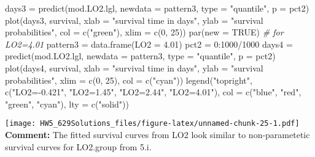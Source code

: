 \documentclass[
]{article}
\newenvironment{Shaded}{\begin{snugshade}}{\end{snugshade}}
\newcommand{\AttributeTok}[1]{\textcolor[rgb]{0.77,0.63,0.00}{#1}}
\newcommand{\CommentTok}[1]{\textcolor[rgb]{0.56,0.35,0.01}{\textit{#1}}}
\newcommand{\ConstantTok}[1]{\textcolor[rgb]{0.00,0.00,0.00}{#1}}
\newcommand{\DecValTok}[1]{\textcolor[rgb]{0.00,0.00,0.81}{#1}}
\newcommand{\FloatTok}[1]{\textcolor[rgb]{0.00,0.00,0.81}{#1}}
\newcommand{\FunctionTok}[1]{\textcolor[rgb]{0.00,0.00,0.00}{#1}}
\newcommand{\NormalTok}[1]{#1}
\newcommand{\OtherTok}[1]{\textcolor[rgb]{0.56,0.35,0.01}{#1}}
\newcommand{\SpecialCharTok}[1]{\textcolor[rgb]{0.00,0.00,0.00}{#1}}
\newcommand{\StringTok}[1]{\textcolor[rgb]{0.31,0.60,0.02}{#1}}
\begin{document}
\begin{Shaded}
\begin{Highlighting}[]
\NormalTok{days3 }\OtherTok{=} \FunctionTok{predict}\NormalTok{(mod.LO2.lgl, }\AttributeTok{newdata =}\NormalTok{ pattern3, }\AttributeTok{type =} \StringTok{"quantile"}\NormalTok{, }\AttributeTok{p =}\NormalTok{ pct2)}
\FunctionTok{plot}\NormalTok{(days3, survival, }\AttributeTok{xlab =} \StringTok{"survival time in days"}\NormalTok{, }\AttributeTok{ylab =} \StringTok{"survival}
\StringTok{     probabilities"}\NormalTok{,}
    \AttributeTok{col =} \FunctionTok{c}\NormalTok{(}\StringTok{"green"}\NormalTok{), }\AttributeTok{xlim =} \FunctionTok{c}\NormalTok{(}\DecValTok{0}\NormalTok{, }\DecValTok{25}\NormalTok{))}
\FunctionTok{par}\NormalTok{(}\AttributeTok{new =} \ConstantTok{TRUE}\NormalTok{)}
\CommentTok{\# for LO2=4.01}
\NormalTok{pattern3 }\OtherTok{=} \FunctionTok{data.frame}\NormalTok{(}\AttributeTok{LO2 =} \FloatTok{4.01}\NormalTok{)}
\NormalTok{pct2 }\OtherTok{=} \DecValTok{0}\SpecialCharTok{:}\DecValTok{1000}\SpecialCharTok{/}\DecValTok{1000}
\NormalTok{days4 }\OtherTok{=} \FunctionTok{predict}\NormalTok{(mod.LO2.lgl, }\AttributeTok{newdata =}\NormalTok{ pattern3, }\AttributeTok{type =} \StringTok{"quantile"}\NormalTok{, }\AttributeTok{p =}\NormalTok{ pct2)}
\FunctionTok{plot}\NormalTok{(days4, survival, }\AttributeTok{xlab =} \StringTok{"survival time in days"}\NormalTok{, }\AttributeTok{ylab =} \StringTok{"survival}
\StringTok{     probabilities"}\NormalTok{,}
    \AttributeTok{xlim =} \FunctionTok{c}\NormalTok{(}\DecValTok{0}\NormalTok{, }\DecValTok{25}\NormalTok{), }\AttributeTok{col =} \FunctionTok{c}\NormalTok{(}\StringTok{"cyan"}\NormalTok{))}
\FunctionTok{legend}\NormalTok{(}\StringTok{"topright"}\NormalTok{, }\FunctionTok{c}\NormalTok{(}\StringTok{"LO2={-}0.421"}\NormalTok{, }\StringTok{"LO2=1.45"}\NormalTok{, }\StringTok{"LO2=2.44"}\NormalTok{, }\StringTok{"LO2=4.01"}\NormalTok{), }\AttributeTok{col =} \FunctionTok{c}\NormalTok{(}\StringTok{"blue"}\NormalTok{,}
    \StringTok{"red"}\NormalTok{, }\StringTok{"green"}\NormalTok{, }\StringTok{"cyan"}\NormalTok{), }\AttributeTok{lty =} \FunctionTok{c}\NormalTok{(}\StringTok{"solid"}\NormalTok{))}
\end{Highlighting}
\end{Shaded}

\texttt{[image: HW5\_629Solutions\_files/figure-latex/unnamed-chunk-25-1.pdf]}
\textbf{Comment:} The fitted survival curves from LO2 look similar to
non-parametetic survival curves for LO2.group from 5.i.
\end{document}
